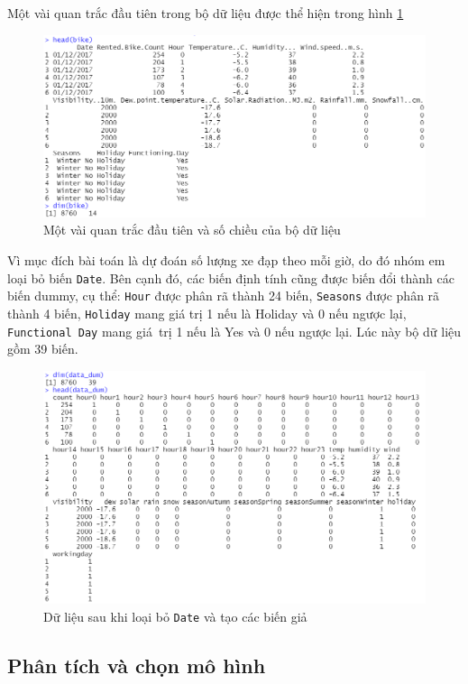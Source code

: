 Một vài quan trắc đầu tiên trong bộ dữ liệu được thể hiện trong hình \ref{A2_head}

\begin{figure}[H]
	\centering
	\includegraphics[width=0.7\linewidth]{../Photo Of Result/A2_head}
	\caption{Một vài quan trắc đầu tiên và số chiều của bộ dữ liệu}
	\label{A2_head}
\end{figure}

Vì mục đích bài toán là dự đoán số lượng xe đạp theo mỗi giờ, do đó nhóm em loại bỏ biến \texttt{Date}. Bên cạnh đó, các biến định tính cũng được biến đổi thành các biến dummy, cụ thể: \texttt{Hour} được phân rã thành 24 biến, \texttt{Seasons} được phân rã thành 4 biến, \texttt{Holiday} mang giá trị 1 nếu là Holiday và 0 nếu ngược lại, \texttt{Functional Day} mang giá~trị 1 nếu là Yes và 0 nếu ngược lại. Lúc này bộ dữ liệu gồm 39 biến.

\begin{figure}[H]
	\centering
	\includegraphics[width=0.7\linewidth]{../Photo Of Result/A2_dummy}
	\caption{Dữ liệu sau khi loại bỏ \texttt{Date} và tạo các biến giả}
	\label{A2_head2}
\end{figure}

\subsection*{Phân tích và chọn mô hình}

